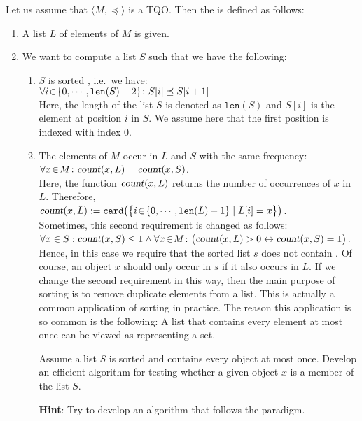 Let us assume that $\langle M, \preceq \rangle$ is a  \textsc{TQO}.
Then the  is defined as follows:
\begin{enumerate}
\item A list $L$ of elements of $M$ is given.
\item We want to compute a list $S$ such that we have the following: 
  \begin{enumerate}
  \item $S$ is sorted , i.e.~we have: \\[0.2cm]
        \hspace*{1.3cm} 
        $\forall i \!\in\! \{ 0, \cdots, \texttt{len}(S)-2 \} \colon S[i] \preceq S[i+1]$ 
        \\[0.2cm]
        Here, the length of the list $S$ is denoted as $\texttt{len}(S)$ and $S[i]$ is the element at position
        $i$ in $S$.  We assume here that the first position is indexed with index $0$.
  \item The elements of $M$ occur in $L$ and $S$ with the same frequency: \\[0.2cm]
        \hspace*{1.3cm} 
        $\forall x\!\in\! M \colon \textsl{count}(x,L) = \textsl{count}(x,S)$.
        \\[0.2cm]
        Here, the function $\textsl{count}(x,L)$ returns the number of occurrences of $x$ in $L$.
        Therefore,  \\[0.2cm]
        \hspace*{1.3cm}
        $\textsl{count}(x,L) := \texttt{card}\bigl(\bigl\{ i \!\in\! \{0,\cdots,\texttt{len}(L)-1\} \mid L[i] = x \bigr\}\bigr)$.
        \\[0.2cm]
        Sometimes, this second requirement is changed as follows:
        \\[0.2cm]
        \hspace*{1.3cm}
        $\forall x \in S: \textsl{count}(x,S) \leq 1 \wedge \forall x\!\in\! M \colon \bigl(\textsl{count}(x,L) > 0 \leftrightarrow \textsl{count}(x,S) = 1\bigr)$.
        \\[0.2cm]
        Hence, in this case we require that the sorted list $s$ does not contain
        .
        Of course, an object $x$ should only occur in $s$ if it also occurs in $L$.  If we change
        the second requirement in this way, then the main purpose of sorting is to remove duplicate
        elements from a list.  This is actually a common application of sorting in practice.  The
        reason this application is so common is the following: A list that contains every element at
        most once can be viewed as representing a set.

        \exercise
        Assume a list $S$ is sorted and contains every object at most once.  Develop an efficient
        algorithm for testing whether a given object $x$ is a member of the list $S$.

        \textbf{Hint}: Try to develop an algorithm that follows the 
        paradigm. 
  \end{enumerate}
\end{enumerate}
